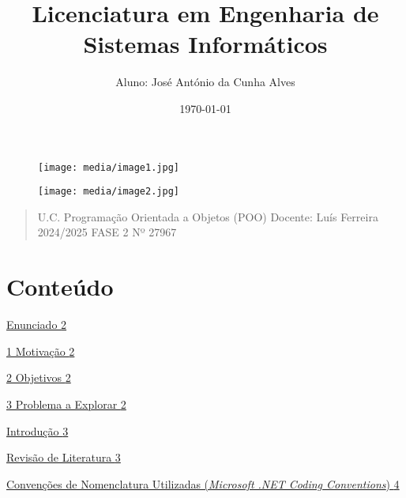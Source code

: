 \documentclass[
]{article}
\title{\textbf{\Huge Licenciatura em Engenharia de Sistemas Informáticos}}
\author{Aluno: José António da Cunha Alves}
\date{\today}
\begin{document}
\pagestyle{empty} %

\begin{figure}[t]
	\centering
	\texttt{[image: media/image1.jpg]}
\end{figure}

\begin{figure}[t]
	\centering
	\texttt{[image: media/image2.jpg]}
\end{figure}

\centering
\maketitle



\vspace{4cm}
\begin{quote}
	\centering
	U.C. Programação Orientada a Objetos (POO)
	Docente: Luís Ferreira
	2024/2025
	FASE 2
	Nº 27967

\end{quote}

\hypertarget{section}{%
\section{}\label{section}}

\hypertarget{conteuxfado}{%
\section{Conteúdo}\label{conteuxfado}}

\protect\hyperlink{enunciado}{Enunciado
\protect\hyperlink{enunciado}{2}}

\protect\hyperlink{motivauxe7uxe3o}{1 Motivação
\protect\hyperlink{motivauxe7uxe3o}{2}}

\protect\hyperlink{_Toc182595576}{2 Objetivos
\protect\hyperlink{_Toc182595576}{2}}

\protect\hyperlink{_Toc182595577}{3 Problema a Explorar
\protect\hyperlink{_Toc182595577}{2}}

\protect\hyperlink{introduuxe7uxe3o}{Introdução
\protect\hyperlink{introduuxe7uxe3o}{3}}

\protect\hyperlink{revisuxe3o-de-literatura}{Revisão de Literatura
\protect\hyperlink{revisuxe3o-de-literatura}{3}}

\protect\hyperlink{convenuxe7uxf5es-de-nomenclatura-utilizadas-microsoft-.net-coding-conventions}{Convenções
de Nomenclatura Utilizadas (\emph{Microsoft .NET Coding Conventions})
\protect\hyperlink{convenuxe7uxf5es-de-nomenclatura-utilizadas-microsoft-.net-coding-conventions}{4}}
\end{document}
